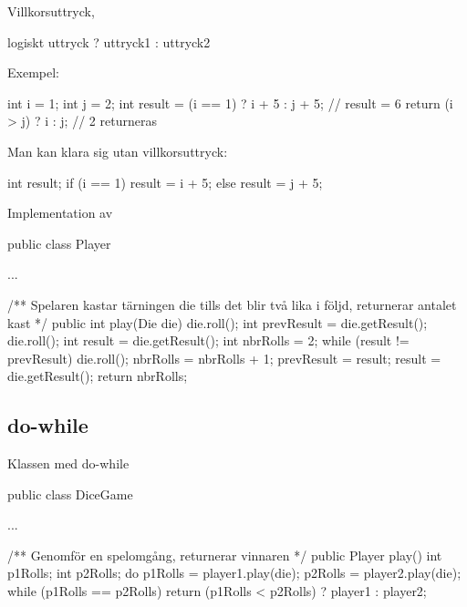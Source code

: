 \documentclass{lecturenotes}
\begin{document}
\begin{Slide}{Villkorsuttryck, }
\begin{Code}
logiskt uttryck ? uttryck1 : uttryck2
\end{Code}

Exempel:
\begin{Code}
int i = 1;
int j = 2;
int result = (i == 1) ? i + 5 : j + 5; // result = 6
return (i > j) ? i : j;                // 2 returneras
\end{Code}

Man kan klara sig utan villkorsuttryck:
\begin{Code}
int result;
if (i == 1) {
    result = i + 5;
} else {
    result = j + 5;
}
\end{Code}
\end{Slide} 

\begin{Slide}{Implementation av }
\begin{Code}
public class Player {
    ...
    
    /** Spelaren kastar tärningen die tills det blir 
        två lika i följd, returnerar antalet kast */
    public int play(Die die) {
        die.roll();
        int prevResult = die.getResult();
        die.roll();
        int result = die.getResult();
        int nbrRolls = 2;
        while (result != prevResult) {
            die.roll();
            nbrRolls = nbrRolls + 1;
            prevResult = result;
            result = die.getResult();
        }
        return nbrRolls;
    }
}
\end{Code}
\end{Slide} 


\subsection{do-while}
\begin{Slide}
{Klassen  med do-while}
\begin{Code}
public class DiceGame {
    ...
    
    /** Genomför en spelomgång, returnerar vinnaren */
    public Player play() {
        int p1Rolls;
        int p2Rolls;
        do  {
            p1Rolls = player1.play(die);
            p2Rolls = player2.play(die);
        } while (p1Rolls == p2Rolls)
        return (p1Rolls < p2Rolls) ?  player1 : player2;
    }
}
\end{Code}
\end{Slide} 
\end{document}
